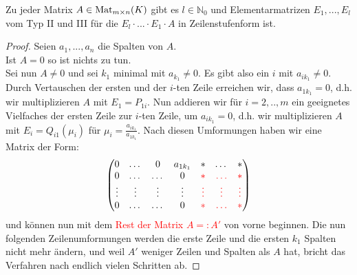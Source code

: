 \begin{theorem}
	Zu jeder Matrix $A\in \operatorname{Mat}_{m\times n}(K)$ gibt es $l\in \mathbb N_0$ und 
	Elementarmatrizen $E_1,...,E_l$ vom Typ II und III für die $E_l\cdot ... \cdot E_1\cdot A$ in Zeilenstufenform ist. 
\end{theorem}
\begin{proof}
	Seien $a_1,...,a_n$ die Spalten von $A$. \\
	Ist $A=0$ so ist nichts zu tun. \\
	Sei nun $A\neq 0$ und sei $k_1$ minimal mit $a_{k_1}\neq 0$. Es gibt also ein $i$ mit $a_{ik_1}\neq 0$. Durch Vertauschen der ersten 
	und der $i$-ten Zeile erreichen wir, dass $a_{1k_1}=0$, d.h. wir multiplizieren $A$ mit $E_1=P_{1i}$. Nun addieren wir für $i=2,..,m$ 
	ein geeignetes Vielfaches der ersten Zeile zur $i$-ten Zeile, um $a_{ik_1}=0$, d.h. wir multiplizieren $A$ mit $E_i=Q_{i1}(\mu_i)$ für 
	$\mu_i=\frac{a_{ik_1}}{a_{1k_1}}$. Nach diesen Umformungen haben wir eine Matrix der Form:
	\begin{align}\begin{pmatrix}
		0 & \dots & 0 & a_{1k_1} & * & \dots & *\\
		0 & \dots & \dots & 0 & \textcolor{red}{*} & \textcolor{red}{\dots} & \textcolor{red}{*}\\
		\vdots & \vdots & \vdots & \vdots & \textcolor{red}{\vdots} & \textcolor{red}{\vdots} & \textcolor{red}{\vdots}\\
		0 & \dots & \dots & 0 & \textcolor{red}{*} & \textcolor{red}{\dots} & \textcolor{red}{*}\\
		\end{pmatrix}\notag\end{align}
	und können nun mit dem \textcolor{red}{Rest der Matrix $A=:A'$} von vorne beginnen. Die nun folgenden Zeilenumformungen werden die erste Zeile und die ersten $k_1$ Spalten nicht mehr ändern, und weil $A'$ weniger Zeilen und Spalten als $A$ hat, bricht das Verfahren nach endlich vielen Schritten ab.
\end{proof}